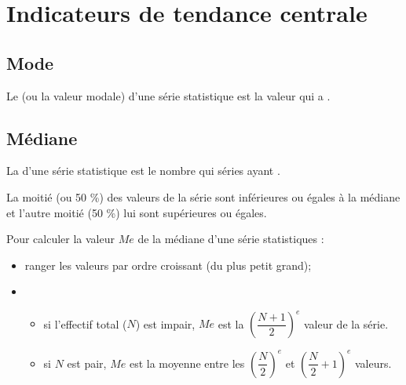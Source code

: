\documentclass[12pt,a4paper]{article}
\date{}
\title{}
\begin{document}
{}

\section{Indicateurs de tendance centrale}


\subsection{Mode}
\begin{mydef}
	Le  (ou la valeur modale) d'une série statistique est la valeur qui a .
\end{mydef}





\subsection{Médiane}

\begin{mydef}
	La  d'une série statistique est le nombre qui  séries ayant .
	
	La moitié (ou 50 \%)  des valeurs de la série sont inférieures ou égales à la médiane et l'autre moitié (50 \%) lui sont supérieures ou égales.
\end{mydef}

\begin{mymeth}
	Pour calculer la valeur $Me$ de la médiane d'une série statistiques :
	\begin{itemize}
		\item ranger les valeurs par ordre croissant (du plus petit grand);
		\item \begin{itemize}
			\item si l'effectif total ($N$) est impair, $Me$ est la $ \left( \dfrac{N+1}{2}\right)  ^e$ valeur de la série.
			\item si $N$ est pair, $Me$ est la moyenne entre les $\left(\dfrac{N}{2}\right)^e$ et  $\left(\dfrac{N}{2} + 1\right)^e$ valeurs.
			
		\end{itemize}
	\end{itemize}
\end{mymeth}
\end{document}
